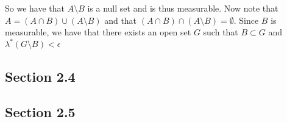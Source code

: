 \documentclass[12pt]{article}
\newenvironment{problem}[2][Problem]{\begin{trivlist}
\item[\hskip \labelsep {\bfseries #1}\hskip \labelsep {\bfseries #2.}]}{\end{trivlist}}
\begin{document}
So we have that $A \setminus B$ is a null set and is thus measurable. Now note that $A = (A \cap B) \cup (A \setminus B)$ and that $(A \cap B) \cap (A \setminus B) = \emptyset$. Since $B$ is measurable, we have that there exists an open set $G$ such that $B \subset G$ and $\lambda^*(G \setminus B) < \epsilon$

\begin{problem}{6}
\end{problem}

\begin{problem}{9}
\end{problem}

\subsection{Section 2.4}

\begin{problem}{2}
\end{problem}

\begin{problem}{4}
\end{problem}

\subsection{Section 2.5}

\begin{problem}{1}
\end{problem}

\begin{problem}{6}
\end{problem}

\begin{problem}{7}
\end{problem}

\begin{problem}{10}
\end{problem}

\begin{problem}{13}
\end{problem}
\end{document}
